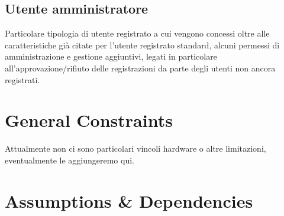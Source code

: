 \documentclass[12pt,a4paper]{report}
\begin{document}
\subsection{Utente amministratore}
Particolare tipologia di utente registrato a cui vengono concessi oltre alle caratteristiche già citate per l’utente registrato standard, alcuni permessi di amministrazione e gestione aggiuntivi, legati in particolare all’approvazione/rifiuto delle registrazioni da parte degli utenti non ancora registrati.



\section{General Constraints}

Attualmente non ci sono particolari vincoli hardware o altre limitazioni, eventualmente le aggiungeremo qui.



\section{Assumptions \& Dependencies}
\end{document}
